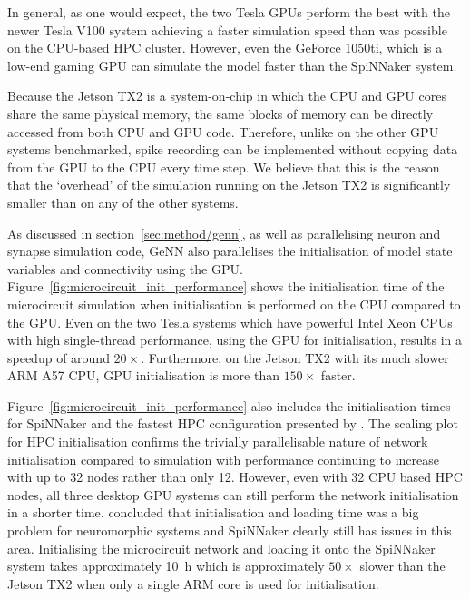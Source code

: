 \documentclass[utf8]{frontiersSCNS} %
\begin{document}
In general, as one would expect, the two Tesla GPUs perform the best with the newer Tesla V100 system achieving a faster simulation speed than was possible on the CPU-based HPC cluster.
However, even the GeForce 1050ti, which is a low-end gaming GPU can simulate the model faster than the SpiNNaker system.

Because the Jetson TX2 is a system-on-chip in which the CPU and GPU cores share the same physical memory, the same blocks of memory can be directly accessed from both CPU and GPU code.
Therefore, unlike on the other GPU systems benchmarked, spike recording can be implemented without copying data from the GPU to the CPU every time step.
We believe that this is the reason that the `overhead' of the simulation running on the Jetson TX2 is significantly smaller than on any of the other systems.

As discussed in section~\ref{sec:method/genn}, as well as parallelising neuron and synapse simulation code, GeNN also parallelises the initialisation of model state variables and connectivity using the GPU.
Figure~\ref{fig:microcircuit_init_performance} shows the initialisation time of the microcircuit simulation when initialisation is performed on the CPU compared to the GPU.
Even on the two Tesla systems which have powerful Intel Xeon CPUs with high single-thread performance, using the GPU for initialisation, results in a speedup of around $20\times$.
Furthermore, on the Jetson TX2 with its much slower ARM A57 CPU, GPU initialisation is more than $150\times$ faster.

Figure~\ref{fig:microcircuit_init_performance} also includes the initialisation times for SpiNNaker and the fastest HPC configuration presented by \citeauthor{VanAlbada2018}.
The scaling plot for HPC initialisation confirms the trivially parallelisable nature of network initialisation compared to simulation with performance continuing to increase with up to 32 nodes rather than only 12.
However, even with 32 CPU based HPC nodes, all three desktop GPU systems can still perform the network initialisation in a shorter time.
\citet{Diamond2018} concluded that initialisation and loading time was a big problem for neuromorphic systems and
SpiNNaker clearly still has issues in this area.
Initialising the microcircuit network and loading it onto the SpiNNaker system takes approximately \SI{10}{\hour} which is approximately $50\times$ slower than the Jetson TX2 when only a single ARM core is used for initialisation.
\end{document}
